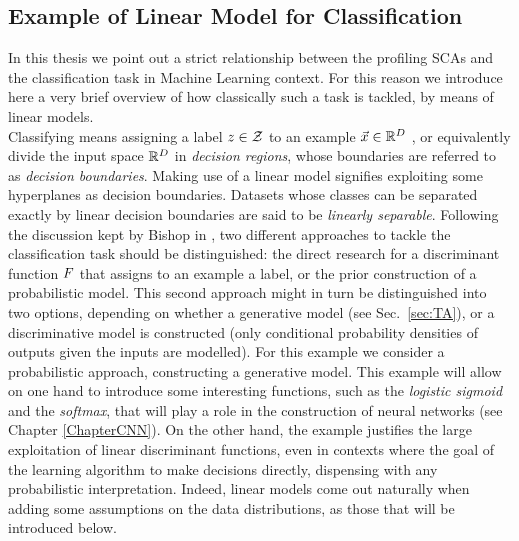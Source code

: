 \subsection{Example of Linear Model for Classification}\label{example:LDA}
In this thesis we point out a strict relationship between the profiling SCAs and the classification task in Machine Learning context. For this reason we introduce here a very brief overview of how classically such a task is tackled, by means of linear models. \\
Classifying means assigning a label $z\in \mathcal{Z}$ to an example $\vec{x}\in\mathbb{R}^D$ , or equivalently divide the input space $\mathbb{R}^D$ in \emph{decision regions}, whose boundaries are referred to as \emph{decision boundaries}. Making use of a linear model signifies exploiting some hyperplanes as decision boundaries. Datasets whose classes can be separated exactly by linear decision boundaries are said to be \emph{linearly separable}. Following the discussion kept by Bishop in \cite{christopher2006pattern}, two different approaches to tackle the classification task should be distinguished: the direct research for a discriminant function $F$ that assigns to an example a label, or the prior construction of a probabilistic model. This second approach might in turn be distinguished into two options, depending on whether a generative model  (see Sec.~\ref{sec:TA}), or a discriminative model is constructed (\ie only conditional probability densities of outputs given the inputs are modelled). For this example we consider a probabilistic approach, constructing a generative model. This example will allow on one hand to introduce some interesting functions, such as the \emph{logistic sigmoid} and the \emph{softmax}, that will play a role in the construction of neural networks (see Chapter \ref{ChapterCNN}). On the other hand, the example justifies the large  exploitation of linear discriminant functions, even in contexts where the goal of the learning algorithm to make decisions directly, dispensing with any probabilistic interpretation. Indeed, linear models come out naturally when adding some assumptions on the data distributions, as those that will be introduced below. \\

